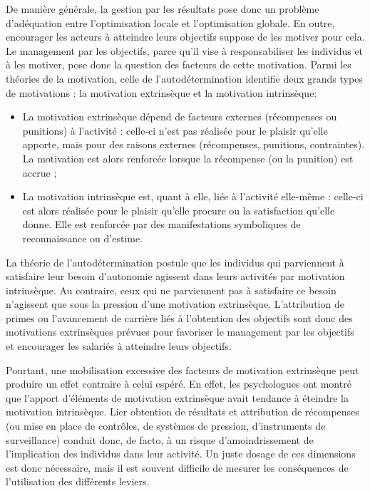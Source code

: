 \documentclass[oneside]{kaobook}
\begin{document}
De manière générale, la gestion par les résultats pose donc un problème d’adéquation entre l’optimisation locale et l’optimisation globale. En outre, encourager les acteurs à atteindre leurs objectifs suppose de les motiver pour cela. Le management par les objectifs, parce qu’il vise à responsabiliser les individus et à les motiver, pose donc la question des facteurs de cette motivation. Parmi les théories de la motivation, celle de l’autodétermination identifie deux grands types de motivations : la motivation extrinsèque et la motivation intrinsèque:
\begin{itemize}
\item La motivation extrinsèque dépend de facteurs externes (récompenses ou punitions) à l’activité : celle-ci n’est pas réalisée pour le plaisir qu’elle apporte, mais pour des raisons externes (récompenses, punitions, contraintes). La motivation est alors renforcée lorsque la récompense (ou la punition) est accrue ;
\item La motivation intrinsèque est, quant à elle, liée à l’activité elle-même : celle-ci est alors réalisée pour le plaisir qu’elle procure ou la satisfaction qu’elle donne. Elle est renforcée par des manifestations symboliques de reconnaissance ou d’estime.
\end{itemize}

La théorie de l’autodétermination postule que les individus qui parviennent à satisfaire leur besoin d’autonomie agissent dans leurs activités par motivation intrinsèque. Au contraire, ceux qui ne parviennent pas à satisfaire ce besoin n’agissent que sous la pression d’une motivation extrinsèque. L’attribution de primes ou l’avancement de carrière liés à l’obtention des objectifs sont donc des motivations extrinsèques prévues pour favoriser le management par les objectifs et encourager les salariés à atteindre leurs objectifs.

Pourtant, une mobilisation excessive des facteurs de motivation extrinsèque peut produire un effet contraire à celui espéré. En effet, les psychologues ont montré que l’apport d’éléments de motivation extrinsèque avait tendance à éteindre la motivation intrinsèque. Lier obtention de résultats et attribution de récompenses (ou mise en place de contrôles, de systèmes de pression, d’instruments de surveillance) conduit donc, de facto, à un risque d’amoindrissement de l’implication des individus dans leur activité. Un juste dosage de ces dimensions est donc nécessaire, mais il est souvent difficile de mesurer les conséquences de l’utilisation des différents leviers.
\end{document}
